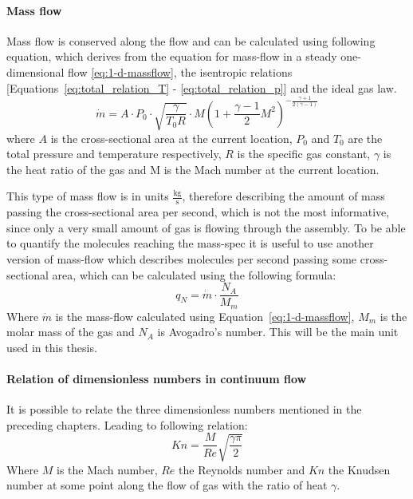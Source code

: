 	\paragraph{Mass flow}
		Mass flow is conserved along the flow and can be calculated using following equation, which derives from the equation for mass-flow in a steady one-dimensional flow \eqref{eq:1-d-massflow}, the isentropic relations [Equations~\eqref{eq:total_relation_T} - \eqref{eq:total_relation_p}] and the ideal gas law.
		\cite{benson_mass_nodate}
		\begin{equation}
			\dot{m} = A \cdot P_0 \cdot \sqrt{\frac{\gamma}{T_0 R}} \cdot M \left(1 + \frac{\gamma - 1}{2} M^2\right)^{-\frac{\gamma + 1}{2(\gamma - 1)}}
			\label{eq:1-d-massflow}
		\end{equation}
		where $A$ is the cross-sectional area at the current location, $P_0$ and $T_0$ are the total pressure and temperature respectively, $R$ is the specific gas constant, $\gamma$ is the heat ratio of the gas and M is the Mach number at the current location.

		This type of mass flow is in units $\frac{\text{kg}}{\text{s}}$, therefore describing the amount of mass passing the cross-sectional area per second, which is not the most informative, since only a very small amount of gas is flowing through the assembly.
		To be able to quantify the molecules reaching the mass-spec it is useful to use another version of mass-flow which describes molecules per second passing some cross-sectional area, which can be calculated using the following formula:
		\begin{equation}
			q_N = \dot{m} \cdot \frac{N_A}{M_m}
			\label{eq:throughput}
		\end{equation}
		Where $\dot{m}$ is the mass-flow calculated using Equation~\eqref{eq:1-d-massflow}, $M_m$ is the molar mass of the gas and $N_A$ is Avogadro's number.
		This will be the main unit used in this thesis.
	\paragraph{Relation of dimensionless numbers in continuum flow}
		It is possible to relate the three dimensionless numbers mentioned in the preceding chapters.
		Leading to following relation:
		\begin{equation}
			Kn = \frac{M}{Re} \sqrt{\frac{\gamma \pi}{2}}
			\label{eq:nondim-relation}
		\end{equation}
		Where $M$ is the Mach number, $Re$ the Reynolds number and $Kn$ the Knudsen number at some point along the flow of gas with the ratio of heat $\gamma$.
		\cite{Cengel2017, LiLam1964, EMMONS1958}

